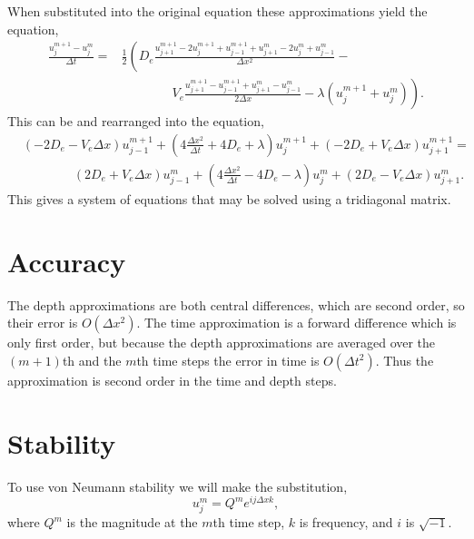 \documentclass[11pt, letterpaper]{article}
\begin{document}
When substituted into the original equation these approximations yield the equation,
\[
    \begin{split}
        \frac{u^{m + 1}_j - u^m_j}{\Delta t} = &\frac{1}{2} \left(
            D_e\frac{u^{m + 1}_{j + 1} - 2u^{m + 1}_j + u^{m + 1}_{j - 1} + u^{m}_{j + 1} - 2u^{m}_j + u^{m}_{j - 1}}{\Delta x^2} - \right. \\
            &\qquad\qquad \left. V_e\frac{u^{m + 1}_{j + 1} - u^{m + 1}_{j - 1} + u^{m}_{j + 1} - u^{m}_{j - 1}}{2\Delta x} - \lambda(u^{m + 1}_j + u^m_j) \right).
    \end{split}
\]
This can be and rearranged into the equation,
\begin{equation}
    \label{eq:iterative_solution}
    \begin{split}
        &(-2D_e - V_e\Delta x)u^{m + 1}_{j -1} + \left(4\frac{\Delta x^2}{\Delta t} + 4D_e + \lambda\right)u^{m + 1}_j + (-2D_e + V_e \Delta x) u^{m + 1}_{j + 1} = \\
        &\qquad\qquad (2D_e + V_e\Delta x)u^{m}_{j -1} + \left(4\frac{\Delta x^2}{\Delta t} - 4D_e - \lambda\right)u^{m}_j + (2D_e - V_e \Delta x) u^{m}_{j + 1}.
    \end{split}
\end{equation}
This gives a system of equations that may be solved using a tridiagonal matrix.

\section*{Accuracy}

The depth approximations are both central differences, which are second order, so their error is $O(\Delta x^2)$.
The time approximation is a forward difference which is only first order, but because the depth approximations are averaged over the $(m + 1)$th and the $m$th time steps the error in time is $O(\Delta t^2)$.
Thus the approximation is second order in the time and depth steps.


\section*{Stability}

To use von Neumann stability we will make the substitution,
\[
    u^m_j = Q^me^{ij\Delta x k},
\]
where $Q^m$ is the magnitude at the $m$th time step, $k$ is frequency, and $i$ is $\sqrt{-1}$.
\end{document}
